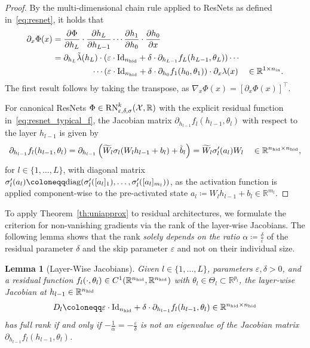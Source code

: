 \documentclass[10pt]{article}
\newtheorem{lemma}[theorem]{Lemma}
\theoremstyle{definition}
\numberwithin{equation}{section}
\newcommand{\eps}{\varepsilon}
\newcommand{\R}{\mathbb{R}}
\newcommand*{\nhid}{n_\textup{hid}}
\newcommand*{\nin}{n_\textup{in}}
\begin{document}
\begin{proof}
	By the multi-dimensional chain rule applied to ResNets as defined in~\eqref{eq:resnet}, it holds that
	\begin{align*}
		\partial_{x} \Phi(x) & =\frac{\partial \Phi}{\partial h_L}\cdot\frac{\partial h_L}{\partial h_{L-1}} \cdots \frac{\partial h_1}{\partial h_0} \cdot \frac{\partial h_0}{\partial x}  \\
		& = \partial_{h_L}\tilde{\lambda}(h_L) \cdot (\eps \cdot \textup{Id}_{\nhid} + \delta \cdot \partial_{h_{L-1}} f_L(h_{L-1},\theta_L)) \cdots \\
		& \hspace{16.5mm} \cdots (\eps \cdot \textup{Id}_{\nhid} + \delta \cdot \partial_{h_{0}} f_1(h_{0},\theta_1))\cdot \partial_x\lambda(x) \quad \in \R^{1 \times \nin}.
	\end{align*}
	The first result follows by taking the transpose, as $\nabla_x \Phi(x) = [\partial_{x} \Phi(x)]^\top$. 
	
	For canonical ResNets $\Phi \in \textup{RN}^k_{\eps,\delta,\sigma}(\mathcal{X},\R)$ with the explicit residual function in~\eqref{eq:resnet_typical_f}, the Jacobian matrix $\partial_{h_{l-1}}f_l(h_{l-1},\theta_l)$ with respect to the layer $h_{l-1}$ is given by
	\begin{equation*}
		\partial_{h_{l-1}}f_l(h_{l-1},\theta_l) =   \partial_{h_{l-1}} \left( \widetilde{W}_l \sigma_l(W_l h_{l-1} + b_l) + \tilde{b}_l\right) =   \widetilde{W}_{l}\sigma'_{l}(a_{l})W_{l} \quad \in \R^{\nhid \times \nhid},
	\end{equation*}
	for $l\in \{1,\ldots,L\}$, with diagonal matrix $\sigma'_l(a_{l}) \coloneqq \textup{diag}(\sigma_l'([a_l]_1),\ldots, \sigma_l'([a_l]_{m_l}))$, as the activation function is applied component-wise to the pre-activated state $a_l \coloneqq W_l h_{l-1} + b_l \in \R^{m_l}$.
\end{proof}

To apply Theorem~\ref{th:uniapprox} to residual architectures, we formulate the criterion for non-vanishing gradients via the rank of the layer-wise Jacobians. The following lemma shows that the rank \emph{solely depends on the ratio} $\alpha \coloneqq \frac{\delta}{\eps}$ of the residual parameter $\delta$ and the skip parameter $\eps$ and not on their individual size.

\begin{lemma}[Layer-Wise Jacobians] \label{lem:resnet_Dl_fullrank}
	Given $l \in \{1,\ldots,L\}$, parameters $\eps, \delta >0$, and a residual function $f_l(\cdot, \theta_l)\in C^{1}(\R^{\nhid},\R^{\nhid})$ with $\theta_l \in \Theta_l \subset \R^{p_l}$, the layer-wise Jacobian at $h_{l-1} \in \R^{\nhid}$
	\begin{equation*}
		D_l \coloneqq \eps \cdot \textup{Id}_{\nhid} + \delta \cdot \partial_{h_{l-1}}f_l(h_{l-1},\theta_l) \in \R^{\nhid \times \nhid}
	\end{equation*}
	has full rank if and only if $ -\frac{1}{\alpha} = -\frac{\eps}{\delta}$ is not an eigenvalue of the Jacobian matrix $\partial_{h_{l-1}}f_l(h_{l-1},\theta_l)$.
\end{lemma}
\end{document}
